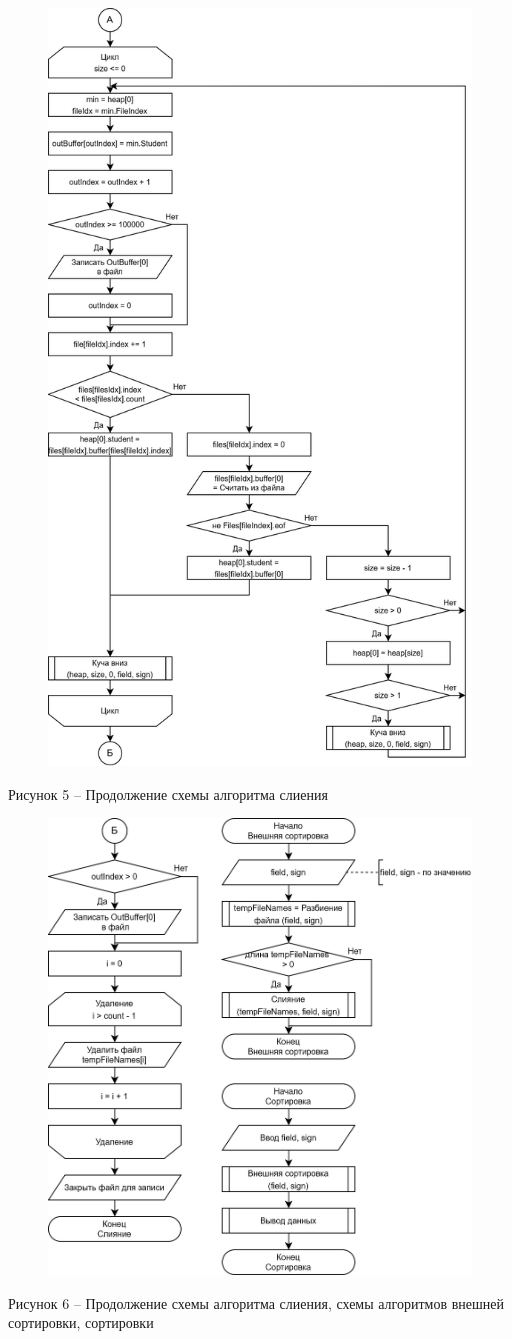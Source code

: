 \documentclass[a4paper,14pt]{extarticle}
\begin{document}
  \begin{figure}[h]
    \centering
    \includegraphics[width=0.65\linewidth]{images/s-6}
  \end{figure}
  \begin{center}
    Рисунок 5 – Продолжение схемы алгоритма слиения
  \end{center}

  \pagebreak

  \begin{figure}[h]
    \centering
    \includegraphics[width=0.7\linewidth]{images/s-7}
  \end{figure}
  \begin{center}
    Рисунок 6 – Продолжение схемы алгоритма слиения, схемы алгоритмов внешней сортировки, сортировки
  \end{center}
\end{document}
